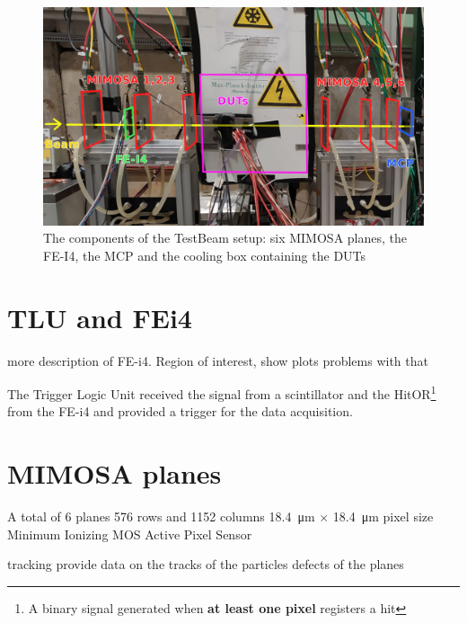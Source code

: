 \begin{figure}[!ht]
    \centering
    \includegraphics[width=.95\linewidth]{Images/TestBeam_setup/TestBeam_setup_redrawn.png}
    \captionsetup{width=.8\linewidth}
    \caption{The components of the TestBeam setup: six MIMOSA planes, the FE-I4, the MCP and the cooling box containing the DUTs}
    \label{fig:testbeam_setup}
\end{figure}

\section{TLU and FEi4}

more description of FE-i4.
Region of interest, show plots
problems with that 

The Trigger Logic Unit received the signal from a scintillator and the HitOR\footnote{A binary signal generated when \textbf{at least one pixel} registers a hit} from the FE-i4 and provided a trigger for the data acquisition.

\section{MIMOSA planes}

A total of 6 planes 
576 rows and 1152 columns
\qty{18.4}{\micro\meter} $ \times$ \qty{18.4}{\micro\meter} pixel size
Minimum Ionizing MOS Active Pixel Sensor

tracking provide data on the tracks of the particles 
defects of the planes


